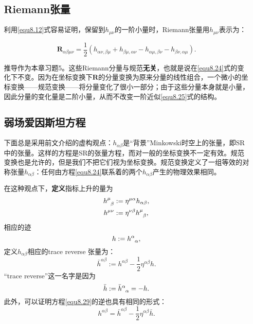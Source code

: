 \subsection*{Riemann张量}
利用\eqref{equ8.12}式容易证明，保留到$h_{\mu \nu}$的一阶小量时，Riemann张量用$h_{\mu \nu}$表示为：
\begin{shaded}
\begin{equation}
    \mathbf{R}_{\alpha \beta \mu \nu} = \frac{1}{2} (h_{\alpha \nu, \beta \mu} + h_{\beta \mu, \alpha \nu} - h_{\alpha \mu, \beta \nu} - h_{\beta \nu, \alpha \mu} ).
\label{equ8.25}
\end{equation}
\end{shaded}
推导作为本章习题5。这些Riemann分量与规范\textbf{无关}，也就是说在\eqref{equ8.24}式的变化下不变。因为在坐标变换下$\mathbf{R}$的分量变换为原来分量的线性组合，一个微小的坐标变换——规范变换——将分量变化了很小一部分；由于这些分量本身就是小量，因此分量的变化量是二阶小量，从而不改变一阶近似\eqref{equ8.25}式的结构。

\subsection*{弱场爱因斯坦方程}
下面总是采用前文介绍的虚构观点：$h_{\alpha \beta}$是“背景”Minkowski时空上的张量，即SR中的张量。这样的方程是SR的张量方程，而对一般的坐标变换不一定有效。规范变换也是允许的，但是我们不把它们视为坐标变换。规范变换定义了一组等效的对称张量$h_{\alpha \beta}$：任何由方程\eqref{equ8.24}联系着的两个$h_{\alpha \beta}$产生的物理效果相同。

在这种观点下，\textbf{定义}指标上升的量为
\begin{align}
    h\indices{^\mu_\beta} &:= \eta^{\mu \alpha} h_{\alpha \beta}, \label{equ8.26} \\
    h^{\mu \nu} &:= \eta^{\nu \beta} h\indices{^\mu_\beta}, \label{equ8.27}
\end{align}
相应的迹
\begin{equation}
    h := h\indices{^\alpha_\alpha}, \label{equ8.28}
\end{equation}
定义$h_{\alpha \beta}$相应的trace reverse 张量为：
\begin{equation}
    \bar{h}^{\alpha \beta} := h^{\alpha \beta} - \frac{1}{2} \eta^{\alpha \beta} h.
\label{equ8.29}
\end{equation}
“trace reverse”这一名字是因为
\begin{equation}
    \bar{h} := \bar{h}\indices{^\alpha_\alpha} = -h. \label{equ8.30}
\end{equation}
此外，可以证明方程\eqref{equ8.29}的逆也具有相同的形式：
\begin{equation}
    h^{\alpha \beta} = \bar{h}^{\alpha \beta} - \frac{1}{2} \eta^{\alpha \beta} \bar{h}.
\label{equ8.31}
\end{equation}

